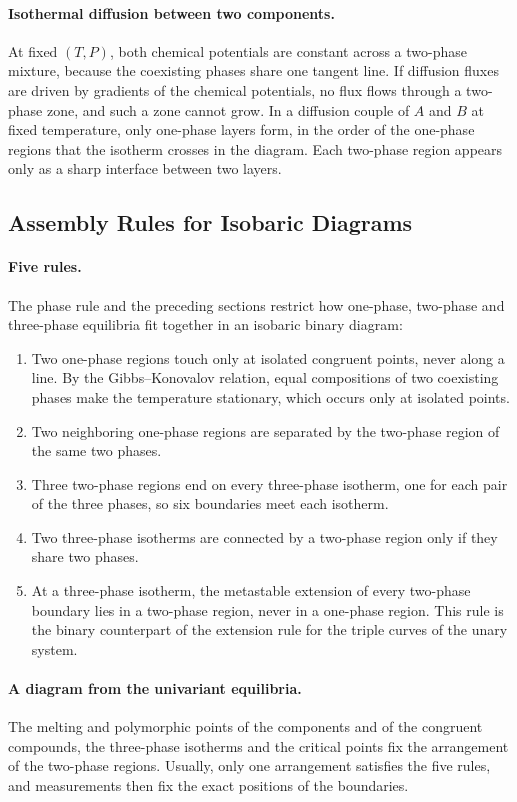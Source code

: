\paragraph{Isothermal diffusion between two components.}
At fixed $(T,P)$, both chemical potentials are constant across a two-phase
mixture, because the coexisting phases share one tangent line. If
diffusion fluxes are driven by gradients of the chemical potentials, no
flux flows through a two-phase zone, and such a zone cannot grow. In a
diffusion couple of $A$ and $B$ at fixed temperature, only one-phase layers
form, in the order of the one-phase regions that the isotherm crosses in
the diagram. Each two-phase region appears only as a sharp interface between
two layers.


\subsection{Assembly Rules for Isobaric Diagrams}

\paragraph{Five rules.}
The phase rule and the preceding sections restrict how one-phase,
two-phase and three-phase equilibria fit together in an isobaric binary
diagram:
\begin{enumerate}
    \item Two one-phase regions touch only at isolated congruent points,
    never along a line. By the Gibbs--Konovalov relation, equal compositions
    of two coexisting phases make the temperature stationary, which occurs
    only at isolated points.
    \item Two neighboring one-phase regions are separated by the two-phase
    region of the same two phases.
    \item Three two-phase regions end on every three-phase isotherm, one for
    each pair of the three phases, so six boundaries meet each isotherm.
    \item Two three-phase isotherms are connected by a two-phase region only
    if they share two phases.
    \item At a three-phase isotherm, the metastable extension of every
    two-phase boundary lies in a two-phase region, never in a one-phase
    region. This rule is the binary counterpart of the extension rule for
    the triple curves of the unary system.
\end{enumerate}

\paragraph{A diagram from the univariant equilibria.}
The melting and polymorphic points of the components and of the congruent
compounds, the three-phase isotherms and the critical points fix the
arrangement of the two-phase regions. Usually, only one arrangement
satisfies the five rules, and measurements then fix the exact positions of
the boundaries.


